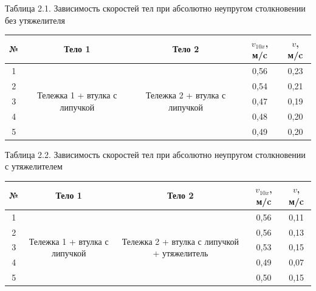 \documentclass[12pt]{article}
\begin{document}
\begin{center}
Таблица 2.1. Зависимость скоростей тел при абсолютно неупругом столкновении без утяжелителя
\begin{table}[h!]
\begin{center}
\begin{tabular}{|c|c|c|c|c|}
\hline
 № & Тело 1 & Тело 2 & $v_{10x}$, м/c & $v$, м/c \\
\hline
 1 &\multirow{5}{70pt}{Тележка 1 + втулка с липучкой}    & \multirow{5}{70pt}{Тележка 2 + втулка с липучкой} & 0,56&	0,23 \\
\hhline{-~~--}

 2 &    &  & 	0,54&	0,21 \\
\hhline{-~~--}
 3 &   &  &0,47&	0,19 \\
\hhline{-~~--}
 4 &  &  &	0,48&	0,20 \\
\hhline{-~~--}
 5 &    &  &	0,49&	0,20 \\
\hline
\end{tabular}
\end{center}
\end{table}

Таблица 2.2. Зависимость скоростей тел при абсолютно неупругом столкновении с утяжелителем
\begin{table}[h!]
\begin{center}
\begin{tabular}{|c|c|c|c|c|}
\hline
 № & Тело 1 & Тело 2 & $v_{10x}$, м/c & $v$, м/c \\
\hline
 1 &\multirow{5}{70pt}{Тележка 1 + втулка с липучкой}    & \multirow{5}{70pt}{Тележка 2 + втулка с липучкой + утяжелитель} & 0,56&	0,11 \\
\hhline{-~~--}

 2 &    &  & 	0,56	&0,13 \\
\hhline{-~~--}
 3 &   &  &0,53	&0,15 \\
\hhline{-~~--}
 4 &  &  &	0,49&	0,07 \\
\hhline{-~~--}
 5 &    &  &	0,50&	0,15 \\
\hline
\end{tabular}
\end{center}
\end{table}                        
\end{center}
\newpage
\end{document}
